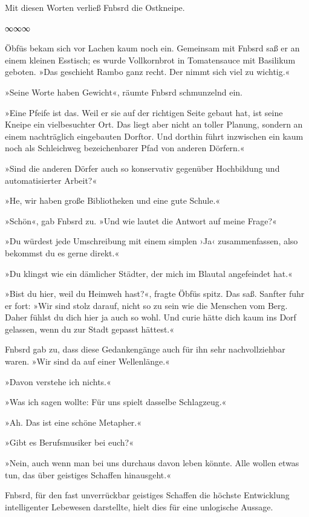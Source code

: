 Mit diesen Worten verließ Fnbsrd die Ostkneipe.

\begin{center}
∞∞∞
\end{center}

Öbfüs bekam sich vor Lachen kaum noch ein. Gemeinsam mit Fnbsrd saß er an einem kleinen Esstisch; es wurde Vollkornbrot in Tomatensauce mit Basilikum geboten. »Das geschieht Rambo ganz recht. Der nimmt sich viel zu wichtig.«

»Seine Worte haben Gewicht«, räumte Fnbsrd schmunzelnd ein.

»Eine Pfeife ist das. Weil er sie auf der richtigen Seite gebaut hat, ist seine Kneipe ein vielbesuchter Ort. Das liegt aber nicht an toller Planung, sondern an einem nachträglich eingebauten Dorftor. Und dorthin führt inzwischen ein kaum noch als Schleichweg bezeichenbarer Pfad von anderen Dörfern.«

»Sind die anderen Dörfer auch so konservativ gegenüber Hochbildung und automatisierter Arbeit?«

»He, wir haben große Bibliotheken und eine gute Schule.«

»Schön«, gab Fnbsrd zu. »Und wie lautet die Antwort auf meine Frage?«

»Du würdest jede Umschreibung mit einem simplen ›Ja‹ zusammenfassen, also bekommst du es gerne direkt.«

»Du klingst wie ein dämlicher Städter, der mich im Blautal angefeindet hat.«

»Bist du hier, weil du Heimweh hast?«, fragte Öbfüs spitz. Das saß. Sanfter fuhr er fort: »Wir sind stolz darauf, nicht so zu sein wie die Menschen vom Berg. Daher fühlst du dich hier ja auch so wohl. Und curie hätte dich kaum ins Dorf gelassen, wenn du zur Stadt gepasst hättest.«

Fnbsrd gab zu, dass diese Gedankengänge auch für ihn sehr nachvollziehbar waren. »Wir sind da auf einer Wellenlänge.«

»Davon verstehe ich nichts.«

»Was ich sagen wollte: Für uns spielt dasselbe Schlagzeug.«

»Ah. Das ist eine schöne Metapher.«

»Gibt es Berufsmusiker bei euch?«

»Nein, auch wenn man bei uns durchaus davon leben könnte. Alle wollen etwas tun, das über geistiges Schaffen hinausgeht.«

Fnbsrd, für den fast unverrückbar geistiges Schaffen die höchste Entwicklung intelligenter Lebewesen darstellte, hielt dies für eine unlogische Aussage.

